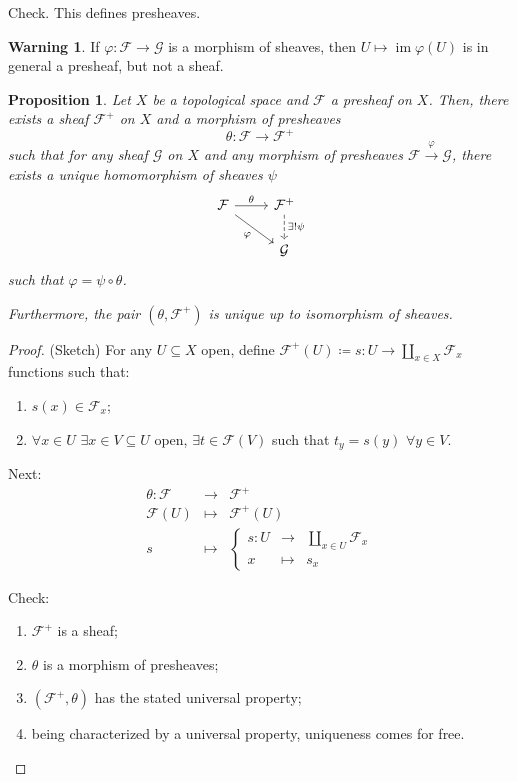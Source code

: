 \documentclass[12pt]{article}
\DeclareMathOperator{\im}{im}
\newtheorem*{proposition}{Proposition}
\theoremstyle{definition}
\newtheorem*{warning}{Warning}
\begin{document}
Check. This defines presheaves.

\begin{warning}
If $\varphi:\mathcal{F}\rightarrow\mathcal{G}$ is a morphism of sheaves, then $U\mapsto\im\varphi(U)$ is in general a presheaf, but not a sheaf.
\end{warning}

\begin{proposition}
Let $X$ be a topological space and $\mathcal{F}$ a presheaf on $X$. Then, there exists a sheaf $\mathcal{F}^+$ on $X$ and a morphism of presheaves
\[\theta:\mathcal{F}\longrightarrow\mathcal{F}^+\]
such that for any sheaf $\mathcal{G}$ on $X$ and any morphism of presheaves $\mathcal{F}\xrightarrow{\varphi}\mathcal{G}$, there exists a unique homomorphism of sheaves $\psi$
\[
\begin{tikzcd}
\mathcal{F}\arrow[r,"\theta"]\arrow[rd,"\varphi",swap]&\mathcal{F}^+\arrow[d,"\exists!\psi",dashed]\\
&\mathcal{G}
\end{tikzcd}
\]
such that $\varphi=\psi\circ\theta$.

Furthermore, the pair $(\theta,\mathcal{F}^+)$ is unique up to isomorphism of sheaves.
\end{proposition}

\begin{proof}
(Sketch) For any $U\subseteq X$ open, define $\mathcal{F}^+(U)\coloneqq s:U\rightarrow\coprod_{x\in X}\mathcal{F}_x$ functions  such that:
\begin{enumerate}[label=\roman*)]
\item $s(x)\in\mathcal{F}_x$;
\item $\forall x\in U$ $\exists x\in V\subseteq U$ open, $\exists t\in\mathcal{F}(V)$ such that $t_y=s(y)$ $\forall y\in V$.
\end{enumerate}

Next:
\[
\begin{array}{rcl}
\theta:\mathcal{F}&\longrightarrow&\mathcal{F}^+\\
\mathcal{F}(U)&\longmapsto&\mathcal{F}^+(U)\\
s&\longmapsto&\left\{\begin{array}{rcl}s:U&\longrightarrow&\coprod_{x\in U}\mathcal{F}_x\\x&\longmapsto&s_x\end{array}\right.
\end{array}
\]

Check:
\begin{enumerate}[label=\arabic*)]
\item $\mathcal{F}^+$ is a sheaf;
\item $\theta$ is a morphism of presheaves;
\item $(\mathcal{F}^+,\theta)$ has the stated universal property;
\item being characterized by a universal property, uniqueness comes for free.
\end{enumerate}
\end{proof}
\end{document}
